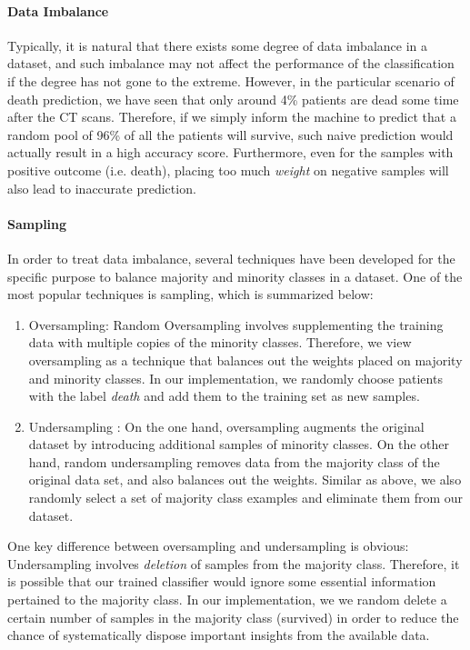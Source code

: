 \documentclass{article}
\begin{document}
\paragraph{Data Imbalance}
Typically, it is natural that there exists some degree of data imbalance in a dataset, and such imbalance may not affect the performance of the classification if the degree has not gone to the extreme. However, in the particular scenario of death prediction, we have seen that only around 4\% patients are dead some time after the CT scans. Therefore, if we simply inform the machine to predict that a random pool of 96\% of all the patients will survive, such naive prediction would actually result in a high accuracy score. Furthermore, even for the samples with positive outcome (i.e. death), placing too much \textit{weight} on negative samples will also lead to inaccurate prediction. 

\paragraph{Sampling}
In order to treat data imbalance, several techniques have been developed for the specific purpose to balance majority and minority classes in a dataset. One of the most popular techniques is sampling, which is summarized below: 

\begin{enumerate}
    \item Oversampling: 
    Random Oversampling involves supplementing the training data with multiple copies of the minority classes. Therefore, we view oversampling as a technique that balances out the weights placed on majority and minority classes. In our implementation, we randomly choose patients with the label \textit{death} and add them to the training set as new samples.
    
    \item Undersampling : 
    On the one hand, oversampling augments the original dataset by introducing additional samples of minority classes. On the other hand, random undersampling removes data from the majority class of the original data set, and also balances out the weights. Similar as above, we also randomly select a set of majority class examples and eliminate them from our dataset. 
\end{enumerate}
    
One key difference between oversampling and undersampling is obvious: Undersampling involves \textit{deletion} of samples from the majority class. Therefore, it is possible that our trained classifier would ignore some essential information pertained to the majority class. In our implementation, we we random delete a certain number of samples in the majority class (survived) in order to reduce the chance of systematically dispose important insights from the available data.
\end{document}
